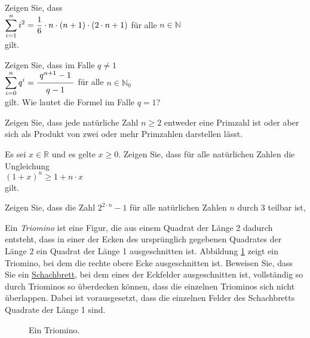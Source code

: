 \exercise
Zeigen Sie, dass
\\[0.2cm]
\hspace*{1.3cm}
$\displaystyle\sum\limits_{i=1}^{n} i^2 = \frac{1}{6} \cdot n \cdot (n+1) \cdot (2 \cdot n + 1)$ \quad
f\"{u}r alle $n \in \mathbb{N}$ 
\\[0.2cm]
gilt.  \exend

\exercise
Zeigen Sie, dass im Falle $q \not= 1$
\\[0.2cm]
\hspace*{1.3cm}
$\ds\sum\limits_{i=0}^{n} q^i = \bruch{q^{n+1} - 1}{q - 1}$ \quad
f\"{u}r alle $n \in \mathbb{N}_0$ 
\\[0.2cm]
gilt.  Wie lautet die Formel im Falle $q=1$? \exend


\exercise  
Zeigen Sie, dass jede nat\"{u}rliche Zahl $n \geq 2$ entweder eine Primzahl ist oder aber sich als  
Produkt von zwei oder mehr Primzahlen darstellen l\"{a}sst.  
\exend  

 
\exercise
Es sei $x \in \mathbb{R}$ und es gelte $x \geq 0$.  Zeigen Sie, dass f\"{u}r alle nat\"{u}rlichen Zahlen die Ungleichung
\\[0.2cm]
\hspace*{1.3cm}
$(1+x)^{n} \geq 1 + n \cdot x$
\\[0.2cm]
gilt.  
\exend


\exercise 
Zeigen Sie, dass die Zahl $2^{2 \cdot n} - 1$ f\"{u}r alle nat\"{u}rlichen Zahlen $n$ durch $3$
teilbar ist,
\exend 
\pagebreak

\exercise
Ein \emph{Triomino} ist eine Figur, die aus einem Quadrat der L\"{a}nge 2 dadurch entsteht, dass in
einer  der Ecken des urspr\"{u}nglich gegebenen Quadrates der L\"{a}nge 2 ein Quadrat der L\"{a}nge 1
ausgeschnitten ist.  Abbildung \ref{fig:triomino.eps} zeigt 
ein Triomino, bei dem die rechte obere Ecke ausgeschnitten ist.  Beweisen Sie, dass Sie ein 
\href{http://de.wikipedia.org/wiki/Schachbrett}{Schachbrett}, bei dem eines der Eckfelder
ausgeschnitten ist, vollst\"{a}ndig so durch Triominos so \"{u}berdecken k\"{o}nnen, dass die einzelnen
Triominos sich nicht \"{u}berlappen.  Dabei ist vorausgesetzt, dass die einzelnen Felder des
Schachbretts Quadrate der L\"{a}nge 1 sind.

\begin{figure}[!ht]
  \centering
  \caption{Ein Triomino.}
  \label{fig:triomino.eps}
\end{figure}

\vspace*{0.2cm}
 
